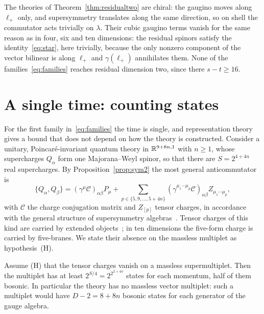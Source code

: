 The theories of Theorem~\ref{thm:residualtwo} are chiral: the gaugino moves along $\ell_+$ only, and supersymmetry translates along the same direction, so on shell the commutator acts trivially on $\lambda$. Their cubic gaugino terms vanish for the same reason as in four, six and ten dimensions: the residual spinors satisfy the identity~\eqref{eq:star}, here trivially, because the only nonzero component of the vector bilinear is along $\ell_+$ and $\gamma(\ell_+)$ annihilates them. None of the families~\eqref{eq:families} reaches residual dimension two, since there $s-t\ge16$.

\section{A single time: counting states}
\label{sec:singletime}

For the first family in~\eqref{eq:families} the time is single, and representation theory gives a bound that does not depend on how the theory is constructed. Consider a unitary, Poincaré-invariant quantum theory in $\mathbb{R}^{9+8n,1}$ with $n\ge1$, whose supercharges $Q_\alpha$ form one Majorana--Weyl spinor, so that there are $S=2^{4+4n}$ real supercharges. By Proposition~\ref{prop:sym2} the most general anticommutator is
\begin{equation}
\label{eq:QQ}
\{Q_\alpha,Q_\beta\}=(\gamma^\mu\mathcal C)_{\alpha\beta}P_\mu+\sum_{p\in\{5,9,\dots,5+4n\}}(\gamma^{\mu_1\cdots\mu_p}\mathcal C)_{\alpha\beta}Z_{\mu_1\cdots\mu_p},
\end{equation}
with $\mathcal C$ the charge conjugation matrix and $Z_{[p]}$ tensor charges, in accordance with the general structure of supersymmetry algebras~\cite{HaagLopuszanskiSohnius1975,vanHoltenVanProeyen1982}. Tensor charges of this kind are carried by extended objects~\cite{deAzcarragaGauntlettIzquierdoTownsend1989}; in ten dimensions the five-form charge is carried by five-branes. We state their absence on the massless multiplet as hypothesis~(H).

\begin{theorem}
\label{thm:singletime}
Assume (H) that the tensor charges vanish on a massless supermultiplet. Then the multiplet has at least $2^{S/4}=2^{2^{2+4n}}$ states for each momentum, half of them bosonic. In particular the theory has no massless vector multiplet: such a multiplet would have $D-2=8+8n$ bosonic states for each generator of the gauge algebra.
\end{theorem}

